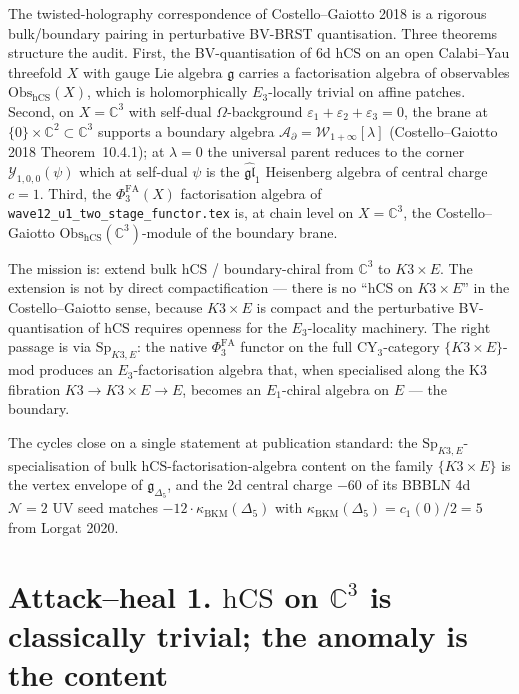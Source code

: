 \documentclass[11pt]{article}
\providecommand{\Eone}{E_1}
\providecommand{\Ethree}{E_3}
\providecommand{\C}{\mathbb{C}}
\providecommand{\cA}{\mathcal{A}}
\providecommand{\cN}{\mathcal{N}}
\providecommand{\cW}{\mathcal{W}}
\providecommand{\cY}{\mathcal{Y}}
\providecommand{\fg}{\mathfrak{g}}
\providecommand{\fgl}{\mathfrak{gl}}
\providecommand{\hCS}{\mathrm{hCS}}
\providecommand{\Obs}{\mathrm{Obs}}
\providecommand{\Sp}{\mathrm{Sp}}
\providecommand{\BKM}{\mathrm{BKM}}
\begin{document}
The twisted-holography correspondence of Costello--Gaiotto 2018 is a
rigorous bulk/boundary pairing in perturbative BV-BRST quantisation.
Three theorems structure the audit. First, the BV-quantisation of
6d $\hCS$ on an open Calabi--Yau threefold $X$ with gauge Lie algebra
$\fg$ carries a factorisation algebra of observables
$\Obs_{\hCS}(X)$, which is holomorphically $\Ethree$-locally trivial on
affine patches. Second, on $X = \C^3$ with self-dual $\Omega$-background
$\varepsilon_1 + \varepsilon_2 + \varepsilon_3 = 0$, the brane at
$\{0\}\times\C^2\subset\C^3$ supports a boundary algebra
$\cA_\partial = \cW_{1+\infty}[\lambda]$ (Costello--Gaiotto 2018
Theorem~10.4.1); at $\lambda = 0$ the universal parent reduces to the
corner $\cY_{1,0,0}(\psi)$ which at self-dual $\psi$ is the
$\widehat{\fgl}_1$ Heisenberg algebra of central charge $c = 1$. Third,
the $\Phi^{\mathrm{FA}}_3(X)$ factorisation algebra of
\texttt{wave12\_u1\_two\_stage\_functor.tex} is, at chain level on
$X = \C^3$, the Costello--Gaiotto $\Obs_{\hCS}(\C^3)$-module of the
boundary brane.

The mission is: extend bulk $\hCS$ / boundary-chiral from $\C^3$ to
$K3 \times E$. The extension is not by direct compactification ---
there is no ``$\hCS$ on $K3 \times E$'' in the Costello--Gaiotto sense,
because $K3 \times E$ is compact and the perturbative BV-quantisation
of $\hCS$ requires openness for the $\Ethree$-locality machinery. The
right passage is via $\Sp_{K3,E}$: the native $\Phi^{\mathrm{FA}}_3$
functor on the full CY$_3$-category $\{K3 \times E\}$-$\mathrm{mod}$
produces an $\Ethree$-factorisation algebra that, when specialised along
the K3 fibration $K3 \to K3 \times E \to E$, becomes an $\Eone$-chiral
algebra on $E$ --- the boundary.

The cycles close on a single statement at publication standard: the
$\Sp_{K3,E}$-specialisation of bulk $\hCS$-factorisation-algebra content
on the family $\{K3 \times E\}$ is the vertex envelope of
$\fg_{\Delta_5}$, and the 2d central charge $-60$ of its BBBLN 4d
$\cN{=}2$ UV seed matches $-12 \cdot \kappa_{\BKM}(\Delta_5)$ with
$\kappa_{\BKM}(\Delta_5) = c_1(0)/2 = 5$ from Lorgat 2020.

\section{Attack--heal 1. $\hCS$ on $\C^3$ is classically trivial; the
  anomaly is the content}
\label{sec:cycle1}
\end{document}
